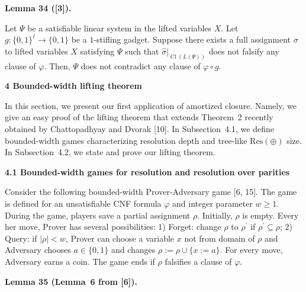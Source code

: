 \documentclass[10pt,a4paper]{article}
\begin{document}
\par\medskip\noindent\textbf{
Lemma 34 ([3]).
}\par



Let $\Psi$ be a satisfiable linear system in the lifted variables $X$. Let $g\colon\{0,1\}^{\ell}\to\{0,1\}$ be a $1$-stifling gadget. Suppose there exists a full assignment $\sigma$ to lifted variables $X$ satisfying $\Psi$ such that $\hat{\sigma}|_{\mathop{\mathrm{Cl}}(L(\Psi))}$ does not falsify any clause of $\varphi$. Then, $\Psi$ does not contradict any clause of $\varphi\circ g$.\par



\par\medskip\noindent\textbf{
4 Bounded-width lifting theorem}\par


In this section, we present our first application of amortized closure. Namely, we give an easy proof of the lifting theorem that extends Theorem 2 recently obtained by Chattopadhyay and Dvorak [10].
In Subsection 4.1, we define bounded-width games characterizing resolution depth and tree-like $\mathrm{Res}(\oplus)$ size. In Subsection 4.2, we state and prove our lifting theorem.\par


\par\medskip\noindent\textbf{
4.1 Bounded-width games for resolution and resolution over parities}\par


Consider the following bounded-width Prover-Adversary game [6, 15]. The game is defined for an unsatisfiable CNF formula $\varphi$ and integer parameter $w\geq 1$. During the game, players save a partial assignment $\rho$. Initially, $\rho$ is empty.
Every her move, Prover has several possibilities:
1) Forget: change $\rho$ to $\rho^{\prime}$ if $\rho^{\prime}\subseteq\rho$;
2) Query: if $|\rho|<w$, Prover can choose a variable $x$ not from domain of $\rho$ and Adversary chooses $a\in\{0,1\}$ and changes $\rho:=\rho\cup\{x:=a\}$. For every move, Adversary earns a coin. The game ends if $\rho$ falsifies a clause of $\varphi$.\par



\par\medskip\noindent\textbf{
Lemma 35 (Lemma 6 from [6]).
}\par
\end{document}
